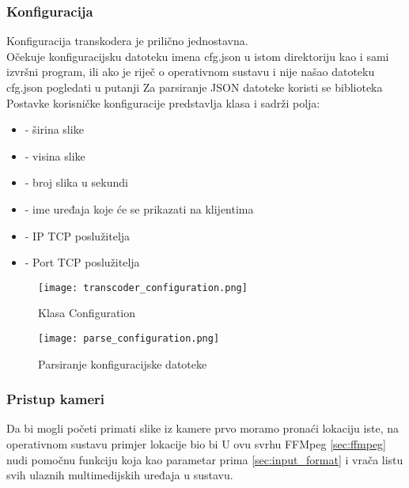 \subsubsection{Konfiguracija}\label{sec:configuration}
Konfiguracija transkodera je prilično jednostavna. \\
Očekuje konfiguracijsku  datoteku imena cfg.json u istom direktoriju kao i sami izvršni program, ili ako je
riječ o operativnom sustavu  i nije našao datoteku cfg.json pogledati u putanji 
\paraBreak
Za parsiranje JSON datoteke koristi se biblioteka  \cite{nlohmanJson}
\paraBreak
Postavke korisničke konfiguracije predstavlja klasa  i sadrži polja:
\begin{itemize}
  \item {} - širina slike
  \item {} - visina slike
  \item {} - broj slika u sekundi
  \item {} - ime uređaja koje će se prikazati na klijentima
  \item {} - IP TCP poslužitelja
  \item {} - Port TCP poslužitelja
\end{itemize}

\begin{figure}[h]
  \centering
  \texttt{[image: transcoder\_configuration.png]}
  \caption{Klasa Configuration}
\end{figure}
\clearpage
\begin{figure}[h]
  \centering
  \texttt{[image: parse\_configuration.png]}
  \caption{Parsiranje konfiguracijske datoteke}
\end{figure}
\clearpage

\subsubsection{Pristup kameri}
Da bi mogli početi primati slike iz kamere prvo moramo pronaći lokaciju iste, na  operativnom sustavu
primjer lokacije bio bi 
\paraBreak
U ovu svrhu FFMpeg \ref{sec:ffmpeg} nudi pomočnu funkciju  koja kao parametar
prima  \ref{sec:input_format} i vrača listu svih ulaznih multimedijskih uređaja u sustavu.
\paraBreak

